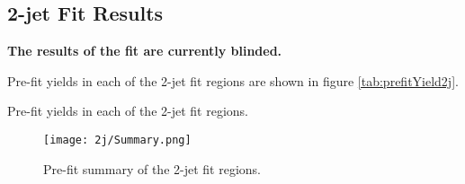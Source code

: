 


\subsection{2-jet Fit Results}

\textbf{The results of the fit are currently blinded.} 

Pre-fit yields in each of the 2-jet fit regions are shown in figure \ref{tab:prefitYield2j}.

\begin{table}[H]
\begin{adjustwidth}{-3em}{-3em}

\label{tab:prefitYield2j}
\caption{Pre-fit yields in each of the 2-jet fit regions.}                                     
\end{adjustwidth}
\end{table}

\begin{figure}[H]
  \center                                                                                                                    
  \texttt{[image: 2j/Summary.png]}
  \caption{Pre-fit summary of the 2-jet fit regions.}                                                                        
  \label{fig:prefitSummary_2j}
\end{figure}

